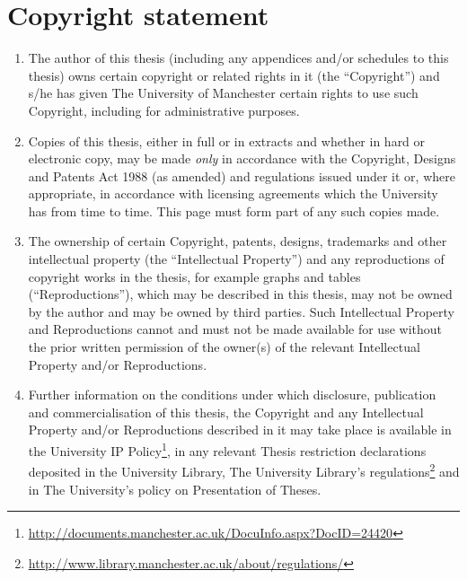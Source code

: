 
\cleardoublepage

{}

\chapter*{Copyright statement}

\vspace*{-0.3cm}

\begin{enumerate}[label=\roman*]

\item The author of this thesis (including any appendices and/or schedules to this thesis) owns certain copyright or related rights in it (the ``Copyright'') and s/he has given The University of Manchester certain rights to use such Copyright, including for administrative purposes.

\item Copies of this thesis, either in full or in extracts and whether in hard or electronic copy, may be made \emph{only} in accordance with the Copyright, Designs and Patents Act 1988 (as amended) and regulations issued under it or, where appropriate, in accordance with licensing agreements which the University has from time to time. This page must form part of any such copies made.

\item The ownership of certain Copyright, patents, designs, trademarks and other intellectual property (the ``Intellectual Property'') and any reproductions of copyright works in the thesis, for example graphs and tables (``Reproductions''), which may be described in this thesis, may not be owned by the author and may be owned by third parties. Such Intellectual Property and Reproductions cannot and must not be made available for use without the prior written permission of the owner(s) of the relevant Intellectual Property and/or Reproductions.

\item Further information on the conditions under which disclosure, publication and commercialisation of this thesis, the Copyright and any Intellectual Property and/or Reproductions described in it may take place is available in the University IP Policy\footnote{\url{http://documents.manchester.ac.uk/DocuInfo.aspx?DocID=24420}}, in any relevant Thesis restriction declarations deposited in the University Library, The University Library’s regulations\footnote{\url{http://www.library.manchester.ac.uk/about/regulations/}} and in The University’s policy on Presentation of Theses.

\end{enumerate}
